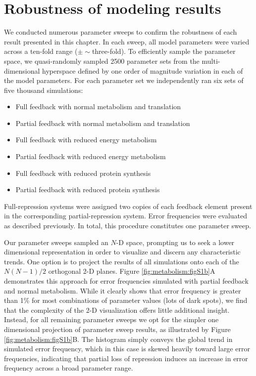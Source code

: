 \section{Robustness of modeling results}
\label{metabolism:robust}

We conducted numerous parameter sweeps to confirm the robustness of each result presented in this chapter. In each sweep, all model parameters were varied across a ten-fold range ($\pm \sim$three-fold). To efficiently sample the parameter space, we quasi-randomly sampled 2500 parameter sets from the multi-dimensional hyperspace defined by one order of magnitude variation in each of the model parameters. For each parameter set we independently ran six sets of five thousand simulations: 

\begin{itemize}
	\item Full feedback with normal metabolism and translation
	\item Partial feedback with normal metabolism and translation
	\item Full feedback with reduced energy metabolism
	\item Partial feedback with reduced energy metabolism
	\item Full feedback with reduced protein synthesis	
	\item Partial feedback with reduced protein synthesis
\end{itemize}

Full-repression systems were assigned two copies of each feedback element present in the corresponding partial-repression system. Error frequencies were evaluated as described previously. In total, this procedure constitutes one parameter sweep. 

Our parameter sweeps sampled an $N$-D space, prompting us to seek a lower dimensional representation in order to visualize and discern any characteristic trends. One option is to project the results of all simulations onto each of the $N(N-1)/2$ orthogonal 2-D planes. Figure \ref{fig:metabolism:figS1b}A demonstrates this approach for error frequencies simulated with partial feedback and normal metabolism. While it clearly shows that error frequency is greater than 1\% for most combinations of parameter values (lots of dark spots), we find that the complexity of the 2-D visualization offers little additional insight. Instead, for all remaining parameter sweeps we opt for the simpler one dimensional projection of parameter sweep results, as illustrated by Figure \ref{fig:metabolism:figS1b}B. The histogram simply conveys the global trend in simulated error frequency, which in this case is skewed heavily toward large error frequencies, indicating that partial loss of repression induces an increase in error frequency across a broad parameter range. 

